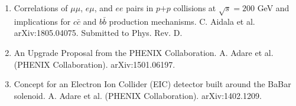 \documentclass[11pt]{article}
\begin{document}
\begin{flushleft}
\begin{center}
\begin{enumerate}
	
			
		\item Correlations of $\mu\mu$, $e\mu$, and $ee$ pairs in $p$$+$$p$ collisions at $\sqrt{s}=200$ GeV and implications for $c\bar{c}$ and $b\bar{b}$ production mechanisms. C. Aidala et al. arXiv:1805.04075. Submitted to Phys. Rev. D.
		\item An Upgrade Proposal from the PHENIX Collaboration. A. Adare et al. (PHENIX Collaboration). arXiv:1501.06197.
		\item Concept for an Electron Ion Collider (EIC) detector built around the BaBar solenoid. A. Adare et al. (PHENIX Collaboration). arXiv:1402.1209.
		
\end{enumerate}
	
\end{center}


\end{flushleft}









\end{document}
